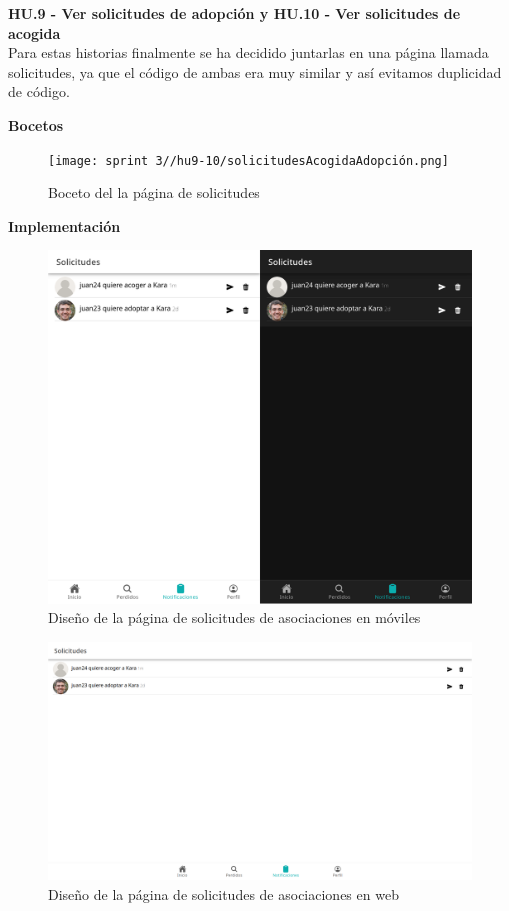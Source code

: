 \Large{\textbf{HU.9 - Ver solicitudes de adopción y HU.10 - Ver solicitudes de acogida}} \\

Para estas historias finalmente se ha decidido juntarlas en una página llamada solicitudes, ya que el código de ambas era muy similar y así evitamos duplicidad de código.

\textbf{Bocetos}
\begin{figure}[H]
	\centering
	\texttt{[image: sprint 3//hu9-10/solicitudesAcogidaAdopción.png]}
	\caption{Boceto del la página de solicitudes}
	\label{fig:boceto_adopt}
\end{figure}


\textbf{Implementación}

\begin{figure} [H]
	\centering
	\includegraphics[width=1\linewidth]{sprint 3//hu9-10/solicitudes.png}
	\caption{Diseño de la página de solicitudes de asociaciones en móviles}
	\label{fig:notificaciones}
\end{figure}

\begin{figure}[H]
	\centering
	\includegraphics[width=1\linewidth]{sprint 3//hu9-10/solicitudesWeb.png}
	\caption{Diseño de la página de solicitudes de asociaciones en web}
\end{figure}

